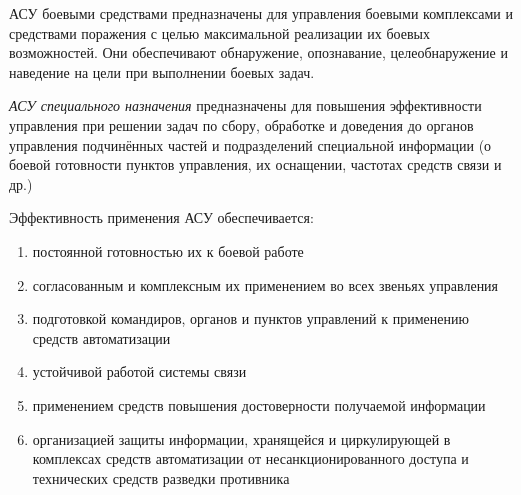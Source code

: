 \documentclass[a4paper,12pt]{article}
\begin{document}
	АСУ боевыми средствами предназначены для управления боевыми комплексами и средствами 
поражения с целью максимальной реализации их боевых возможностей. Они обеспечивают обнаружение, 
опознавание, целеобнаружение и наведение на цели при выполнении боевых задач.
	
	{\em АСУ специального назначения} предназначены для повышения эффективности управления при 
решении задач по сбору, обработке и доведения до органов управления подчинённых частей и 
подразделений специальной информации (о боевой готовности пунктов управления, их оснащении, 
частотах средств связи и др.)

	Эффективность применения АСУ обеспечивается:
	\begin{enumerate}
		\item постоянной готовностью их к боевой работе
		\item согласованным и комплексным их применением во всех звеньях управления
		\item подготовкой командиров, органов и пунктов управлений к применению средств
		автоматизации
		\item устойчивой работой системы связи
		\item применением средств повышения достоверности получаемой информации
		\item организацией защиты информации, хранящейся и циркулирующей в комплексах средств 
		автоматизации от несанкционированного доступа и технических средств разведки противника
	\end{enumerate}
\end{document}
